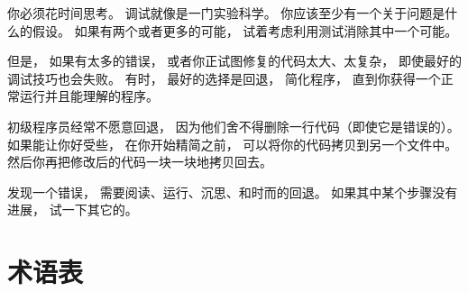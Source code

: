 {


你必须花时间思考。  调试就像是一门实验科学。  
你应该至少有一个关于问题是什么的假设。  
如果有两个或者更多的可能， 试着考虑利用测试消除其中一个可能。  


但是， 如果有太多的错误， 或者你正试图修复的代码太大、太复杂， 
即使最好的调试技巧也会失败。  
有时， 最好的选择是回退， 简化程序， 直到你获得一个正常运行并且能理解的程序。  


初级程序员经常不愿意回退， 因为他们舍不得删除一行代码（即使它是错误的）。  
如果能让你好受些， 在你开始精简之前， 可以将你的代码拷贝到另一个文件中。  
然后你再把修改后的代码一块一块地拷贝回去。  


发现一个错误， 需要阅读、运行、沉思、和时而的回退。  
如果其中某个步骤没有进展， 试一下其它的。  

\section{术语表}
\begin{description}


\end{description}}
